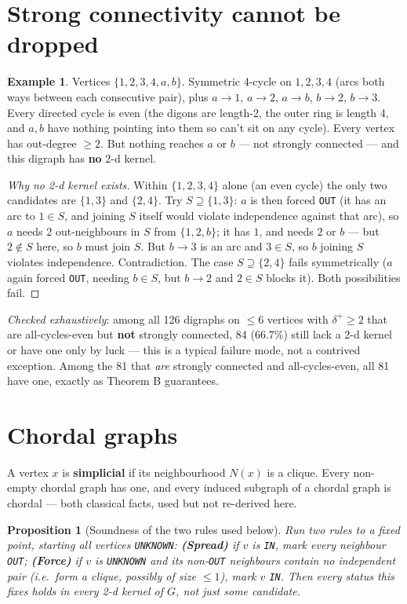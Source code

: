 \documentclass[11pt]{article}
\theoremstyle{plain}
\newtheorem{proposition}[theorem]{Proposition}
\theoremstyle{definition}
\newtheorem{example}[theorem]{Example}
\theoremstyle{remark}
\begin{document}
\section{Strong connectivity cannot be dropped}

\begin{example}
Vertices $\{1,2,3,4,a,b\}$. Symmetric 4-cycle on $1,2,3,4$ (arcs both ways between
each consecutive pair), plus $a\to1$, $a\to2$, $a\to b$, $b\to2$, $b\to3$. Every
directed cycle is even (the digons are length-2, the outer ring is length 4, and $a,b$
have nothing pointing into them so can't sit on any cycle). Every vertex has
out-degree $\ge2$. But nothing reaches $a$ or $b$ — not strongly connected — and this
digraph has \textbf{no} 2-d kernel.
\end{example}

\begin{proof}[Why no 2-d kernel exists]
Within $\{1,2,3,4\}$ alone (an even cycle) the only two candidates are $\{1,3\}$ and
$\{2,4\}$. Try $S \supseteq \{1,3\}$: $a$ is then forced \texttt{OUT} (it has an arc
to $1\in S$, and joining $S$ itself would violate independence against that arc), so
$a$ needs 2 out-neighbours in $S$ from $\{1,2,b\}$; it has $1$, and needs $2$ or $b$
— but $2\notin S$ here, so $b$ must join $S$. But $b\to3$ is an arc and $3\in S$, so
$b$ joining $S$ violates independence. Contradiction. The case $S\supseteq\{2,4\}$
fails symmetrically ($a$ again forced \texttt{OUT}, needing $b\in S$, but $b\to2$ and
$2\in S$ blocks it). Both possibilities fail.
\end{proof}

\emph{Checked exhaustively}: among all 126 digraphs on $\le6$ vertices with
$\delta^+\ge2$ that are all-cycles-even but \textbf{not} strongly connected, 84
(66.7\%) still lack a 2-d kernel or have one only by luck — this is a typical failure
mode, not a contrived exception. Among the 81 that \emph{are} strongly connected and
all-cycles-even, all 81 have one, exactly as Theorem B guarantees.

\section{Chordal graphs}

A vertex $x$ is \textbf{simplicial} if its neighbourhood $N(x)$ is a clique. Every
non-empty chordal graph has one, and every induced subgraph of a chordal graph is
chordal — both classical facts, used but not re-derived here.

\begin{proposition}[Soundness of the two rules used below]
Run two rules to a fixed point, starting all vertices \texttt{UNKNOWN}: \textbf{(Spread)}
if $v$ is \texttt{IN}, mark every neighbour \texttt{OUT}; \textbf{(Force)} if $v$ is
\texttt{UNKNOWN} and its non-\texttt{OUT} neighbours contain no independent pair
(i.e.\ form a clique, possibly of size $\le1$), mark $v$ \texttt{IN}. Then every
status this fixes holds in \emph{every} 2-d kernel of $G$, not just some candidate.
\end{proposition}
\end{document}
